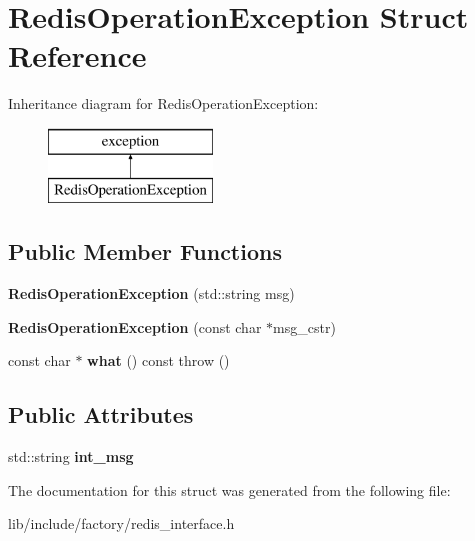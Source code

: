 \hypertarget{structRedisOperationException}{\section{Redis\-Operation\-Exception Struct Reference}
\label{structRedisOperationException}
}
Inheritance diagram for Redis\-Operation\-Exception\-:\begin{figure}[H]
\begin{center}
\leavevmode
\includegraphics[height=2.000000cm]{structRedisOperationException}
\end{center}
\end{figure}
\subsection*{Public Member Functions}
\begin{DoxyCompactItemize}
\item 
\hypertarget{structRedisOperationException_a54e07b6a7c4d81ab0cb4d1f61d5a6226}{{\bfseries Redis\-Operation\-Exception} (std\-::string msg)}\label{structRedisOperationException_a54e07b6a7c4d81ab0cb4d1f61d5a6226}

\item 
\hypertarget{structRedisOperationException_a330513962eb439159cf494f3996edc8c}{{\bfseries Redis\-Operation\-Exception} (const char $\ast$msg\-\_\-cstr)}\label{structRedisOperationException_a330513962eb439159cf494f3996edc8c}

\item 
\hypertarget{structRedisOperationException_a629e013517496f9e14ae5286a8759043}{const char $\ast$ {\bfseries what} () const   throw ()}\label{structRedisOperationException_a629e013517496f9e14ae5286a8759043}

\end{DoxyCompactItemize}
\subsection*{Public Attributes}
\begin{DoxyCompactItemize}
\item 
\hypertarget{structRedisOperationException_ac5deeab2028bb95e7db928cfb222656e}{std\-::string {\bfseries int\-\_\-msg}}\label{structRedisOperationException_ac5deeab2028bb95e7db928cfb222656e}

\end{DoxyCompactItemize}


The documentation for this struct was generated from the following file\-:\begin{DoxyCompactItemize}
\item 
lib/include/factory/redis\-\_\-interface.\-h\end{DoxyCompactItemize}
